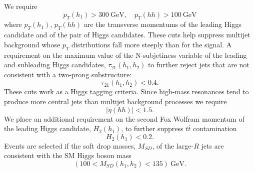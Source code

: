 We require
\begin{equation}
	p_T(h_1)>300~\text{GeV}, \quad p_T(hh)>100 ~\text{GeV}
\end{equation}
where $p_T(h_1)$, $p_T(hh)$ are the transverse momentums of the leading Higgs candidate and of the pair of Higgs candidates.
These cuts help suppress multijet background whose $p_T$ distributions fall more steeply than for the signal. A requirement on the maximum value of the N-subjetiness variable of the leading and subleading Higgs candidates, $\tau_{21}(h_1,h_2)$ to further reject jets that are not consistent with a two-prong substructure:
\begin{equation}
	\tau_{21}(h_1,h_2)<0.4.
\end{equation}
These cuts work as a Higgs tagging criteria.
Since high-mass resonances tend to produce more central jets than multijet background processes we require
\begin{equation}
	|\eta(hh)|<1.5.
\end{equation}
We place an additional requirement on the second Fox Wolfram momentum of the leading Higgs candidate, $H_2(h_1)$, to further suppress $t\overline{t}$ contamination
\begin{equation}
	H_2(h_1)<0.2.
\end{equation}
Events are selected if the soft drop masses, $M_{SD}$, of the large-$R$ jets are consistent with the SM Higgs boson mass
\begin{equation}
	(100<M_{SD}(h_1,h_2)<135) ~\text{GeV}.
\end{equation}

%


